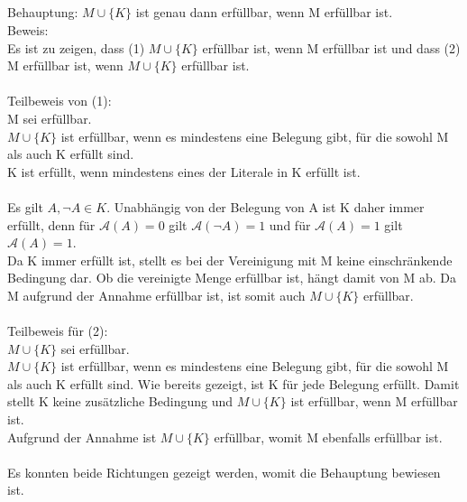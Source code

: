 \documentclass[10pt,a4paper,oneside,ngerman,numbers=noenddot]{scrartcl}
\begin{document}
\subsection{} %
Behauptung: $M \cup \{K\}$ ist genau dann erfüllbar, wenn M erfüllbar ist.\\
Beweis:\\
Es ist zu zeigen, dass (1) $M \cup \{K\}$ erfüllbar ist, wenn M erfüllbar ist und dass (2) M erfüllbar ist, wenn $M \cup \{K\}$ erfüllbar ist.\\
\\
Teilbeweis von (1):\\
M sei erfüllbar.\\
$M \cup \{K\}$ ist erfüllbar, wenn es mindestens eine Belegung gibt, für die sowohl M als auch K erfüllt sind.\\
K ist erfüllt, wenn mindestens eines der Literale in K erfüllt ist.\\
\\
Es gilt $A, \neg A \in K$. Unabhängig von der Belegung von A ist K daher immer erfüllt, denn für $\mathcal{A}(A) = 0$ gilt $\mathcal{A}(\neg A) = 1$ und für $\mathcal{A}(A) = 1$ gilt $\mathcal{A}(A) = 1$.\\
Da K immer erfüllt ist, stellt es bei der Vereinigung mit M keine einschränkende Bedingung dar. Ob die vereinigte Menge erfüllbar ist, hängt damit von M ab. Da M aufgrund der Annahme erfüllbar ist, ist somit auch $M \cup \{K\}$ erfüllbar.\\
\\
Teilbeweis für (2):\\
$M \cup \{K\}$ sei erfüllbar.\\
$M \cup \{K\}$ ist erfüllbar, wenn es mindestens eine Belegung gibt, für die sowohl M als auch K erfüllt sind. Wie bereits gezeigt, ist K für jede Belegung erfüllt. Damit stellt K keine zusätzliche Bedingung und $M \cup \{K\}$ ist erfüllbar, wenn M erfüllbar ist.\\
Aufgrund der Annahme ist $M \cup \{K\}$ erfüllbar, womit M ebenfalls erfüllbar ist.\\
\\
Es konnten beide Richtungen gezeigt werden, womit die Behauptung bewiesen ist.
\section{} %
\subsection{} %
\setcounter{subsubsection}{0}
\end{document}
